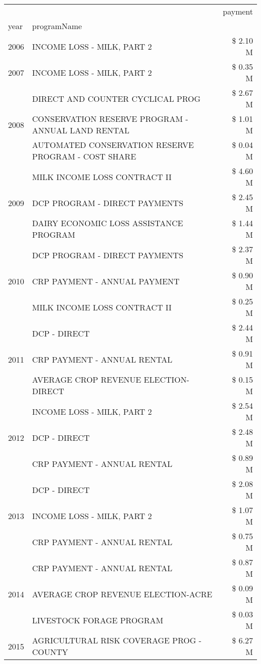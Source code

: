 \begin{tabular}{llr}
\toprule
 &  & payment \\
year & programName &  \\
\midrule
2006 & INCOME LOSS - MILK, PART 2 & \$ 2.10 M \\
\cline{1-3}
2007 & INCOME LOSS - MILK, PART 2 & \$ 0.35 M \\
\cline{1-3}
\multirow[t]{3}{*}{2008} & DIRECT AND COUNTER CYCLICAL PROG & \$ 2.67 M \\
 & CONSERVATION RESERVE PROGRAM - ANNUAL LAND RENTAL & \$ 1.01 M \\
 & AUTOMATED CONSERVATION RESERVE PROGRAM - COST SHARE & \$ 0.04 M \\
\cline{1-3}
\multirow[t]{3}{*}{2009} & MILK INCOME LOSS CONTRACT II & \$ 4.60 M \\
 & DCP PROGRAM - DIRECT PAYMENTS & \$ 2.45 M \\
 & DAIRY ECONOMIC LOSS ASSISTANCE PROGRAM & \$ 1.44 M \\
\cline{1-3}
\multirow[t]{3}{*}{2010} & DCP PROGRAM - DIRECT PAYMENTS & \$ 2.37 M \\
 & CRP PAYMENT - ANNUAL PAYMENT & \$ 0.90 M \\
 & MILK INCOME LOSS CONTRACT II & \$ 0.25 M \\
\cline{1-3}
\multirow[t]{3}{*}{2011} & DCP - DIRECT & \$ 2.44 M \\
 & CRP PAYMENT - ANNUAL RENTAL & \$ 0.91 M \\
 & AVERAGE CROP REVENUE ELECTION-DIRECT & \$ 0.15 M \\
\cline{1-3}
\multirow[t]{3}{*}{2012} & INCOME LOSS - MILK, PART 2 & \$ 2.54 M \\
 & DCP - DIRECT & \$ 2.48 M \\
 & CRP PAYMENT - ANNUAL RENTAL & \$ 0.89 M \\
\cline{1-3}
\multirow[t]{3}{*}{2013} & DCP - DIRECT & \$ 2.08 M \\
 & INCOME LOSS - MILK, PART 2 & \$ 1.07 M \\
 & CRP PAYMENT - ANNUAL RENTAL & \$ 0.75 M \\
\cline{1-3}
\multirow[t]{3}{*}{2014} & CRP PAYMENT - ANNUAL RENTAL & \$ 0.87 M \\
 & AVERAGE CROP REVENUE ELECTION-ACRE & \$ 0.09 M \\
 & LIVESTOCK FORAGE PROGRAM & \$ 0.03 M \\
\cline{1-3}
\multirow[t]{2}{*}{2015} & AGRICULTURAL RISK COVERAGE PROG - COUNTY & \$ 6.27 M \\

\end{tabular}
